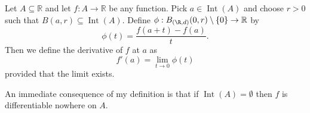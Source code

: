 	
	\begin{definition}
		Let $A \subseteq \mathbb{R}$ and let $f : A \to \mathbb{R}$ be any function. Pick $a \in \operatorname{Int}(A)$ and choose $r > 0$ such that $B(a, r) \subseteq \operatorname{Int}(A)$. Define $\phi : B_{(\R, d)}(0, r) \setminus \{0\} \to \mathbb{R}$ by $$\phi(t) = \frac{f(a+t) - f(a)}{t}.$$ Then we define the derivative of $f$ at $a$ as $$f'(a) = \lim_{t \to 0} \phi(t)$$ provided that the limit exists.
	\end{definition}
	
	\begin{point}
	An immediate consequence of my definition is that if $\operatorname{Int}(A) = \emptyset$ then $f$ is differentiable nowhere on $A$.
\end{point}
	
	\todog{}